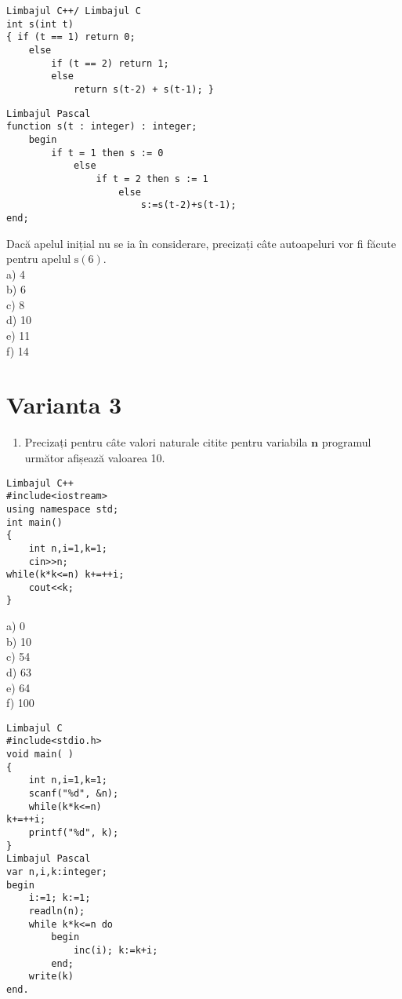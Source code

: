 \begin{verbatim}
Limbajul C++/ Limbajul C
int s(int t)
{ if (t == 1) return 0;
    else
        if (t == 2) return 1;
        else
            return s(t-2) + s(t-1); }
\end{verbatim}

\begin{verbatim}
Limbajul Pascal
function s(t : integer) : integer;
    begin
        if t = 1 then s := 0
            else
                if t = 2 then s := 1
                    else
                        s:=s(t-2)+s(t-1);
end;
\end{verbatim}

Dacă apelul inițial nu se ia în considerare, precizați câte autoapeluri vor fi făcute pentru apelul $\mathrm{s}(6)$.\\
a) 4\\
b) 6\\
c) 8\\
d) 10\\
e) 11\\
f) 14

\section*{Varianta 3}
\begin{enumerate}
  \item Precizați pentru câte valori naturale citite pentru variabila $\mathbf{n}$ programul următor afișează valoarea 10.
\end{enumerate}

\begin{verbatim}
Limbajul C++
#include<iostream>
using namespace std;
int main()
{
    int n,i=1,k=1;
    cin>>n;
while(k*k<=n) k+=++i;
    cout<<k;
}
\end{verbatim}

a) 0\\
b) 10\\
c) 54\\
d) 63\\
e) 64\\
f) 100

\begin{verbatim}
Limbajul C
#include<stdio.h>
void main( )
{
    int n,i=1,k=1;
    scanf("%d", &n);
    while(k*k<=n)
k+=++i;
    printf("%d", k);
}
Limbajul Pascal
var n,i,k:integer;
begin
    i:=1; k:=1;
    readln(n);
    while k*k<=n do
        begin
            inc(i); k:=k+i;
        end;
    write(k)
end.
\end{verbatim}

